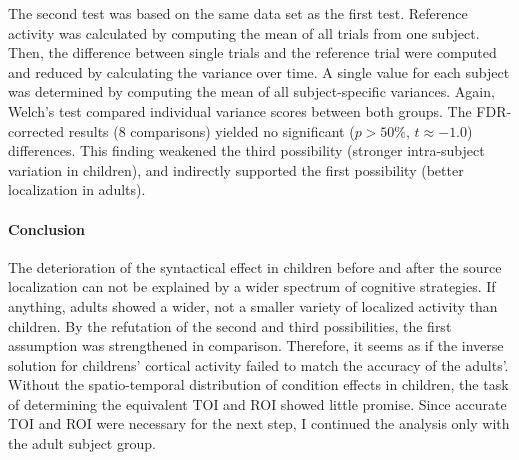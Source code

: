 The second test was based on the same data set as the first test.
Reference activity was calculated by computing the mean of all trials from one subject.
Then, the difference between single trials and the reference trial were computed and reduced by calculating the variance over time.
A single value for each subject was determined by computing the mean of all subject-specific variances.
Again, Welch's test compared individual variance scores between both groups.
The FDR-corrected results (8 comparisons) yielded no significant ($p > 50\%$, $t \approx -1.0$) differences.
This finding weakened the third possibility (stronger intra-subject variation in children), and indirectly supported the first possibility (better localization in adults).

\paragraph{Conclusion}
The deterioration of the syntactical effect in children before and after the source localization can not be explained by a wider spectrum of cognitive strategies.
If anything, adults showed a wider, not a smaller variety of localized activity than children.
By the refutation of the second and third possibilities, the first assumption was strengthened in comparison.
Therefore, it seems as if the inverse solution for childrens' cortical activity failed to match the accuracy of the adults'.
Without the spatio-temporal distribution of condition effects in children, the task of determining the equivalent TOI and ROI showed little promise.
Since accurate TOI and ROI were necessary for the next step, I continued the analysis only with the adult subject group.